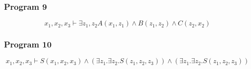 \subsubsection{Program 9}
$$x_1, x_2, x_3 \vdash \exists z_1,z_2 A(x_1,z_1) \land B(z_1,z_2) \land C(z_2,x_2)$$

\subsubsection{Program 10}
$$x_1, x_2, x_3 \vdash S(x_1, x_2, x_3) \land (\exists z_1.\exists z_2.S(z_1,z_2,z_3)) \land (\exists z_1.\exists z_2.S(z_1,z_2,z_3))$$

